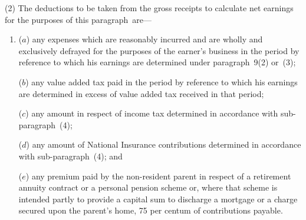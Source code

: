 \documentclass[12pt,a4paper]{article}
\begin{document}
(2) The deductions to be taken from the gross receipts to calculate net earnings for the purposes of this paragraph~are—
\begin{enumerate}\item[]
($a$) any expenses which are reasonably incurred and are wholly and exclusively defrayed for the purposes of the earner’s business in the period by reference to which his earnings are determined under paragraph~9(2) or~(3);

($b$) any value added tax paid in the period by reference to which his earnings are determined in excess of value added tax received in that period;

($c$) any amount in respect of income tax determined in accordance with sub-paragraph~(4);

($d$) any amount of National Insurance contributions determined in accordance with sub-paragraph~(4); and

($e$) any premium paid by the non-resident parent in respect of a retirement annuity contract or a personal pension scheme or, where that scheme is intended partly to provide a capital sum to discharge a mortgage or a charge secured upon the parent’s home, 75 per centum of contributions payable.
\end{enumerate}
\end{document}
